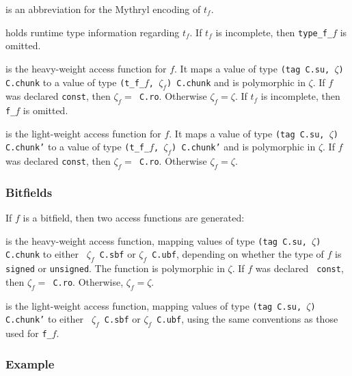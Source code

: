 \begin{description}\setlength{\itemsep}{0pt}
\item[{\tt type t\_f\_$f$}] is an abbreviation for the Mythryl encoding of $t_f$.
\item[!{\tt my type\_f\_$f$}] holds runtime type information regarding
  $t_f$.  If $t_f$ is incomplete, then {\tt type\_f\_$f$} is omitted.
\item[!{\tt my f\_$f$}] is the heavy-weight access function for $f$.
  It maps a value of type {\tt (tag C.su, $\zeta$) C.chunk} to a value
  of type {\tt (t\_f\_$f$, ${\zeta}_f$) C.chunk} and is polymorphic in
  $\zeta$.  If $f$ was declared {\tt const}, then {\tt ${\zeta}_f =$
    C.ro}.  Otherwise ${\zeta}_f = \zeta$.  If $t_f$ is incomplete,
  then {\tt f\_$f$} is omitted.
\item[{\tt my f\_$f$'}] is the light-weight access function for $f$.
  It maps a value of type {\tt (tag C.su, $\zeta$) C.chunk'} to a value
  of type {\tt (t\_f\_$f$, ${\zeta}_f$) C.chunk'} and is polymorphic in
  $\zeta$.  If $f$ was declared {\tt const}, then {\tt ${\zeta}_f =$
    C.ro}.  Otherwise ${\zeta}_f = \zeta$.
\end{description}

\subsubsection*{Bitfields}

If $f$ is a bitfield, then two access functions are generated:

\begin{description}\setlength{\itemsep}{0pt}
\item[{\tt my f\_$f$}] is the heavy-weight access function, mapping
  values of type {\tt (tag C.su, $\zeta$) C.chunk} to either {\tt
    ${\zeta}_f$ C.sbf} or {\tt ${\zeta}_f$ C.ubf}, depending on
  whether the type of $f$ is {\tt signed} or {\tt unsigned}.  The
  function is polymorphic in $\zeta$.  If $f$ was declared {\tt
    const}, then {\tt ${\zeta}_f =$ C.ro}.  Otherwise, ${\zeta}_f =
  \zeta$.
\item[{\tt my f\_$f$'}] is the light-weight access function, mapping
  values of type {\tt (tag C.su, $\zeta$) C.chunk'} to either {\tt
    ${\zeta}_f$ C.sbf} or {\tt ${\zeta}_f$ C.ubf}, using the same
  conventions as those used for {\tt f\_$f$}.
\end{description}

\subsubsection*{Example}

